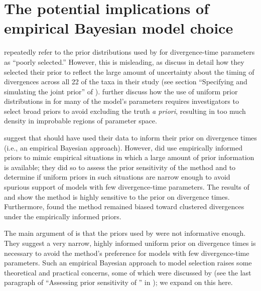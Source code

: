 \section{The potential implications of empirical Bayesian model choice}
\citet{Hickerson2013} repeatedly refer to the prior distributions used by
\citet{Oaks2012} for divergence-time parameters as ``poorly selected.''
However, this is misleading, as \citet{Oaks2012} discuss in detail how they
selected their prior to reflect the large amount of uncertainty about the
timing of divergences across all 22 of the taxa in their study (see section
``Specifying and simulating the joint prior'' of \citet{Oaks2012}).
\citet{Oaks2012} further discuss how the use of uniform prior distributions in
\msb for many of the model's parameters requires investigators to select broad
priors to avoid excluding the truth \textit{a priori}, resulting in too much
density in improbable regions of parameter space.

\citet{Hickerson2013} suggest that \citet{Oaks2012} should have used their
data to inform their prior on divergence times (i.e., an empirical Bayesian
approach).
However, \citet{Oaks2012} did use empirically informed priors to mimic
empirical situations in which a large amount of prior information is available;
they did so to assess the prior sensitivity of the method and to determine if
uniform priors in such situations are narrow enough to avoid spurious support
of models with few divergence-time parameters.
The results of \citet{Oaks2012} and \citet{Hickerson2013} show the method is
highly sensitive to the prior on divergence times.
Furthermore, \citet{Oaks2012} found the method remained biased toward clustered
divergences under the empirically informed priors.

The main argument of \citet{Hickerson2013} is that the priors used by
\citet{Oaks2012} were not informative enough.
They suggest a very narrow, highly informed uniform prior on divergence times
is necessary to avoid the method's preference for models with few
divergence-time parameters.
Such an empirical Bayesian approach to model selection raises some theoretical
and practical concerns, some of which were discussed by \citet{Oaks2012} (see
the last paragraph of ``Assessing prior sensitivity of \msb'' in
\citet{Oaks2012}); we expand on this here.

